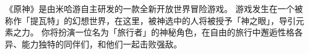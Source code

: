 \cleardoublepage %


\begin{assessmenttext}
    \par 《原神》是由米哈游自主研发的一款全新开放世界冒险游戏。
    游戏发生在一个被称作「提瓦特」的幻想世界，在这里，被神选中的人将被授予「神之眼」，导引元素之力。
    你将扮演一位名为「旅行者」的神秘角色，在自由的旅行中邂逅性格各异、能力独特的同伴们，和他们一起击败强敌。
\end{assessmenttext}

\null\clearpage